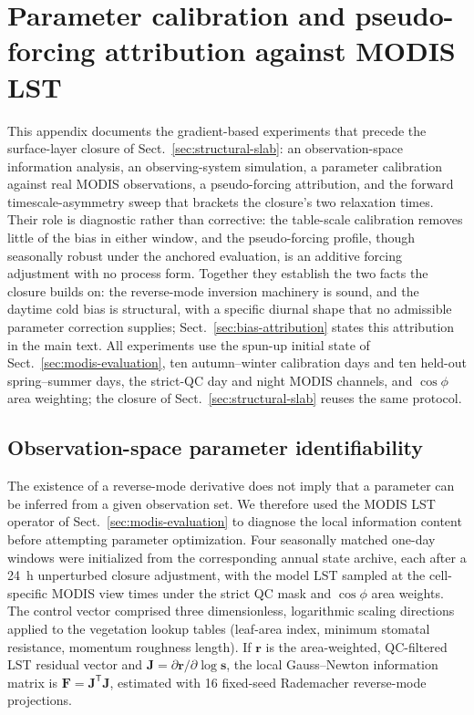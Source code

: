 \section{Parameter calibration and pseudo-forcing attribution against MODIS LST}
\label{app:modis-calibration}

This appendix documents the gradient-based experiments that precede the
surface-layer closure of Sect.~\ref{sec:structural-slab}: an
observation-space information analysis, an observing-system simulation, a
parameter calibration against real MODIS observations, a pseudo-forcing
attribution, and the forward timescale-asymmetry sweep that brackets the
closure's two relaxation times. Their role is diagnostic rather than
corrective: the table-scale calibration removes little of the bias in either
window, and the pseudo-forcing profile, though seasonally robust under the
anchored evaluation, is an additive forcing adjustment with no process form.
Together they
establish the two facts the closure builds on: the reverse-mode inversion
machinery is sound, and the daytime cold bias is structural, with a specific
diurnal shape that no admissible parameter correction supplies;
Sect.~\ref{sec:bias-attribution} states this attribution in the main text. All experiments use the spun-up initial
state of Sect.~\ref{sec:modis-evaluation}, ten autumn--winter calibration days
and ten held-out spring--summer days, the strict-QC day and night MODIS
channels, and $\cos\phi$ area weighting; the closure of
Sect.~\ref{sec:structural-slab} reuses the same protocol.

\subsection{Observation-space parameter identifiability}
\label{sec:modis-identifiability}

The existence of a reverse-mode derivative does not imply that a parameter
can be inferred from a given observation set. We therefore used the MODIS LST
operator of Sect.~\ref{sec:modis-evaluation} to diagnose the local
information content before attempting parameter optimization. Four seasonally
matched one-day windows were initialized from the corresponding annual state
archive, each after a 24~h unperturbed closure adjustment, with the model LST
sampled at the cell-specific MODIS view times under the strict QC mask and
$\cos\phi$ area weights. The control vector comprised three dimensionless,
logarithmic scaling directions applied to the vegetation lookup tables
(leaf-area index, minimum stomatal resistance, momentum roughness length).
If $\boldsymbol{r}$ is the area-weighted, QC-filtered LST residual vector
and $\boldsymbol{J}=\partial\boldsymbol{r}/\partial\log\boldsymbol{s}$, the
local Gauss--Newton information matrix is
$\boldsymbol{F}=\boldsymbol{J}^{\mathsf{T}}\boldsymbol{J}$, estimated with 16
fixed-seed Rademacher reverse-mode projections.

